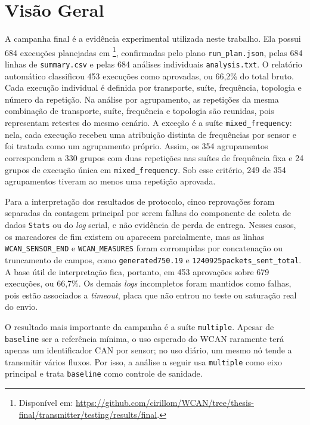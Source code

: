 \section{Visão Geral}

A campanha final é a evidência experimental utilizada neste trabalho. Ela possui
684 execuções planejadas em \footnote{Disponível em: \url{https://github.com/cirillom/WCAN/tree/thesis-final/transmitter/testing/results/final}.}, confirmadas
pelo plano \texttt{run\_plan.json}, pelas 684 linhas de \texttt{summary.csv} e
pelas 684 análises individuais \texttt{analysis.txt}. O relatório automático
classificou 453 execuções como aprovadas, ou 66,2\% do total bruto. Cada
execução individual é definida por transporte, suíte, frequência, topologia e
número da repetição. Na análise por agrupamento, as repetições da mesma
combinação de transporte, suíte, frequência e topologia são reunidas, pois
representam retestes do mesmo cenário. A exceção é a suíte \texttt{mixed\_frequency}:
nela, cada execução recebeu uma atribuição distinta de frequências por sensor e
foi tratada como um agrupamento próprio. Assim, os 354 agrupamentos correspondem
a 330 grupos com duas repetições nas suítes de frequência fixa e 24 grupos de
execução única em \texttt{mixed\_frequency}. Sob esse critério, 249 de 354
agrupamentos tiveram ao menos uma repetição aprovada.

Para a interpretação dos resultados de protocolo, cinco reprovações foram
separadas da contagem principal por serem falhas do componente de coleta de
dados \texttt{Stats} ou do
\emph{log} serial, e não evidência de perda de entrega. Nesses casos, os marcadores de
fim existem ou aparecem parcialmente, mas as linhas \texttt{WCAN\_SENSOR\_END} e
\texttt{WCAN\_MEASURES} foram corrompidas por concatenação ou truncamento de
campos, como \texttt{generated750.19} e \texttt{1240925packets\_sent\_total}. A
base útil de interpretação fica, portanto, em 453 aprovações sobre 679 execuções,
ou 66,7\%. Os demais \emph{logs} incompletos foram mantidos como falhas, pois estão
associados a \emph{timeout}, placa que não entrou no teste ou saturação real do envio.

O resultado mais importante da campanha é a suíte \texttt{multiple}. Apesar de
\texttt{baseline} ser a referência mínima, o uso esperado do WCAN raramente terá
apenas um identificador CAN por sensor; no uso diário, um mesmo nó tende a transmitir vários
fluxos. Por isso, a análise a seguir usa \texttt{multiple} como eixo principal e
trata \texttt{baseline} como controle de sanidade.


